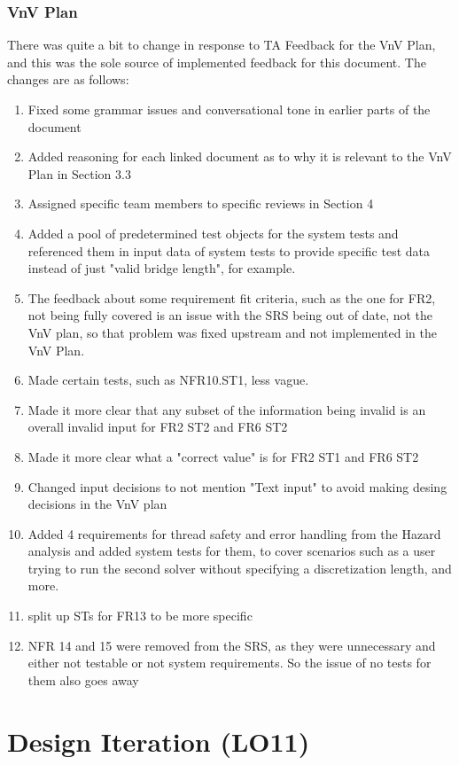 \documentclass{article}
\begin{document}
\subsubsection{VnV Plan}
There was quite a bit to change in response to TA Feedback for the VnV Plan, and this was the sole source of implemented feedback for this document. The changes are as follows:
\begin{enumerate}
  \item Fixed some grammar issues and conversational tone in earlier parts of the document
  \item Added reasoning for each linked document as to why it is relevant to the VnV Plan in Section 3.3
  \item Assigned specific team members to specific reviews in Section 4
  \item Added a pool of predetermined test objects for the system tests and referenced them in input data of system tests to provide specific test data instead of just 
  "valid bridge length", for example.
  \item The feedback about some requirement fit criteria, such as the one for FR2, not being fully covered is an issue with the SRS being out of date, not the VnV plan, so that
  problem was fixed upstream and not implemented in the VnV Plan.
  \item Made certain tests, such as NFR10.ST1, less vague.
  \item Made it more clear that any subset of the information being invalid is an overall invalid input for FR2 ST2 and FR6 ST2
  \item Made it more clear what a "correct value" is for FR2 ST1 and FR6 ST2
  \item Changed input decisions to not mention "Text input" to avoid making desing decisions in the VnV plan
  \item Added 4 requirements for thread safety and error handling from the Hazard analysis and added system tests for them, to cover scenarios such as a user trying to run the 
  second solver without specifying a discretization length, and more.
  \item split up STs for FR13 to be more specific
  \item NFR 14 and 15 were removed from the SRS, as they were unnecessary and either not testable or not system requirements. So the issue of no tests for them also goes away
\end{enumerate}

\section{Design Iteration (LO11)}
\end{document}
